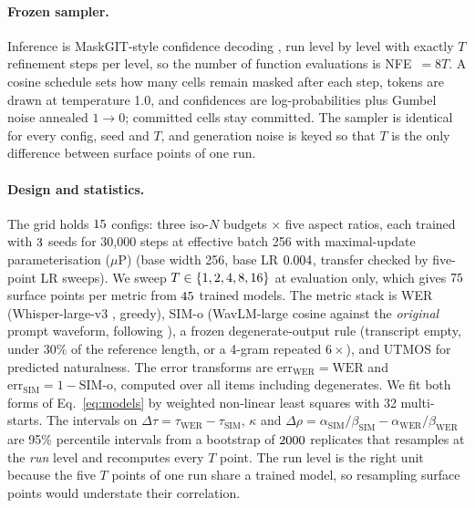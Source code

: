\documentclass{article}
\newcommand{\tc}[1]{\textcolor{tcol}{#1}}
\begin{document}
\paragraph{Frozen sampler.}
Inference is MaskGIT-style confidence decoding \citep{maskgit}, run level by level with
exactly \tc{$T$ refinement steps per level}, so the number of function evaluations is NFE~$= 8T$. A cosine schedule sets how many
cells remain masked after each step, tokens are drawn at temperature 1.0, and confidences are
log-probabilities plus Gumbel noise annealed $1 \to 0$; committed cells stay committed. The
sampler is identical for every config, seed and $T$, and generation noise is keyed so that
$T$ is the only difference between surface points of one run.

\paragraph{Design and statistics.}
The grid holds $15$ configs: three iso-$N$ budgets $\times$ five aspect ratios, each
trained with $3$ seeds for 30{,}000 steps at effective batch 256 with maximal-update parameterisation ($\mu$P) \citep{mup}
(base width 256, base LR $0.004$, transfer checked by five-point LR sweeps). We sweep
$T \in \{1, 2, 4, 8, 16\}$ at evaluation only, which gives $75$ surface points per metric from
$45$ trained models. The metric stack is WER (Whisper-large-v3 \citep{whisper}, greedy),
SIM-o (WavLM-large \citep{wavlm} cosine against the \emph{original} prompt waveform, following
\citet{voicebox,seedtts}), a frozen degenerate-output rule (transcript empty, under 30\% of the reference length, or a 4-gram repeated $6\times$), and UTMOS \citep{utmos} for predicted naturalness. The error
transforms are $\mathrm{err}_{\mathrm{WER}} = \mathrm{WER}$ and
$\mathrm{err}_{\mathrm{SIM}} = 1 - \text{SIM-o}$, computed over all items including
degenerates. We fit both forms of Eq.~\eqref{eq:models} by weighted non-linear least squares
with 32 multi-starts. The intervals on $\Delta\tau = \tau_{\mathrm{WER}} -
\tau_{\mathrm{SIM}}$, $\kappa$ and $\Delta\rho = \alpha_{\mathrm{SIM}}/\beta_{\mathrm{SIM}} -
\alpha_{\mathrm{WER}}/\beta_{\mathrm{WER}}$ are 95\% percentile intervals from a bootstrap \citep{efron1979bootstrap} of
$2000$ replicates that resamples at the \emph{run} level and recomputes every $T$ point.
The run level is the right unit because the five $T$ points of one run share a trained model,
so resampling surface points would understate their correlation.
\end{document}
